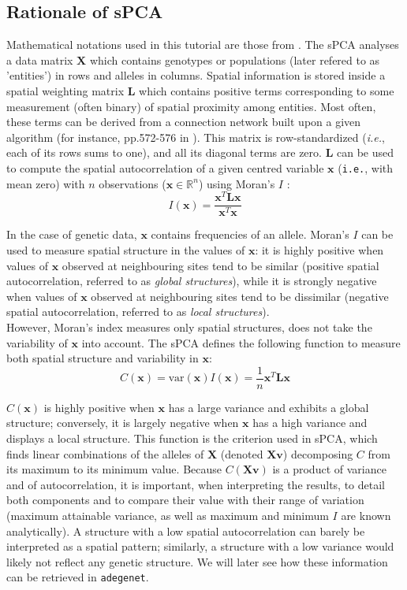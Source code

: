 \documentclass{article}
\newcommand{\R}{\mathbb{R}}
\newcommand{\beq}{\begin{equation}}
\newcommand{\eeq}{\end{equation}}
\newcommand{\m}[1]{\mathbf{#1}}
\begin{document}
\subsection{Rationale of sPCA}
Mathematical notations used in this tutorial are those from \cite{tjart04}.
The sPCA analyses a data matrix $\m{X}$ which contains genotypes or
populations (later refered to as 'entities') in rows and alleles in columns.
Spatial information is stored inside a spatial weighting matrix
$\m{L}$ which contains positive terms corresponding to some measurement
(often binary) of spatial proximity among entities.
Most often, these terms can be derived from a connection network built
upon a given algorithm (for instance, pp.572-576 in \cite{tj88}).
This matrix is row-standardized (\textit{i.e.}, each of its rows sums
to one), and all its diagonal terms are zero.
$\m{L}$ can be used to compute the spatial autocorrelation of a
given centred variable $\m{x}$ (\texttt{i.e.}, with mean zero) with $n$ observations ($\m{x} \in
\R^n$) using Moran's $I$ \cite{tj223,tj222,tj436}:
\beq
I(\m{x}) = \frac{\m{x}^T\m{Lx}}{\m{x}^T\m{x}}
\label{eqn:I}
\eeq

In the case of genetic data, $\m{x}$ contains frequencies of an allele.
Moran's $I$ can be used to measure spatial structure in the values
of $\m{x}$: it is highly positive when values of $\m{x}$ observed at
neighbouring sites tend to be similar (positive spatial
autocorrelation, referred to as \emph{global structures}), while it is
strongly negative when values of $\m{x}$ observed at
neighbouring sites tend to be dissimilar (negative spatial
autocorrelation, referred to as \emph{local structures}).
\\


However, Moran's index measures only spatial structures, does not take
the variability of $\m{x}$ into account.
The sPCA defines the following function to measure both spatial
structure and variability in $\m{x}$:
\beq
C(\m{x}) = \mbox{var}(\m{x})I(\m{x}) = \frac{1}{n}\m{x}^T\m{Lx}
\label{eqn:C}
\eeq

$C(\m{x})$ is highly positive when $\m{x}$ has a large variance and
exhibits a global structure; conversely, it is largely negative
when $\m{x}$ has a high variance and displays a local structure.
This function is the criterion used in sPCA, which finds linear
combinations of the alleles of $\m{X}$ (denoted $\m{Xv}$) decomposing $C$ from its
maximum to its minimum value.
Because $C(\m{Xv})$ is a product of variance and of autocorrelation,
it is important, when interpreting the results, to detail both
components and to compare their value with their range of variation
(maximum attainable variance, as well as maximum and minimum $I$ are
known analytically).
A structure with a low spatial autocorrelation can barely be
interpreted as a spatial pattern; similarly, a structure with a low
variance would likely not reflect any genetic structure.
We will later see how these information can be retrieved in \texttt{adegenet}.
\end{document}
